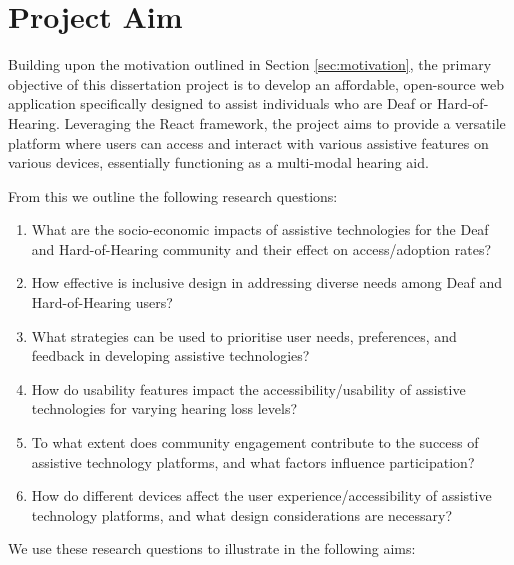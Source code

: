 \documentclass{l4proj}
\begin{document}
\section{Project Aim}
\label{sec:aims}

Building upon the motivation outlined in Section \ref{sec:motivation}, the primary objective of this dissertation project is to develop an affordable, open-source web application specifically designed to assist individuals who are Deaf or Hard-of-Hearing. Leveraging the React framework, the project aims to provide a versatile platform where users can access and interact with various assistive features on various devices, essentially functioning as a multi-modal hearing aid. 

From this we outline the following research questions: 

\begin{enumerate}[{RQ}.1]
    \item What are the socio-economic impacts of assistive technologies for the Deaf and Hard-of-Hearing community and their effect on access/adoption rates?
    \item How effective is inclusive design in addressing diverse needs among Deaf and Hard-of-Hearing users?
    \item What strategies can be used to prioritise user needs, preferences, and feedback in developing assistive technologies?
    \item How do usability features impact the accessibility/usability of assistive technologies for varying hearing loss levels?
    \item To what extent does community engagement contribute to the success of assistive technology platforms, and what factors influence participation?
    \item How do different devices affect the user experience/accessibility of assistive technology platforms, and what design considerations are necessary?
\end{enumerate}


We use these research questions to illustrate in the following aims:
\end{document}
